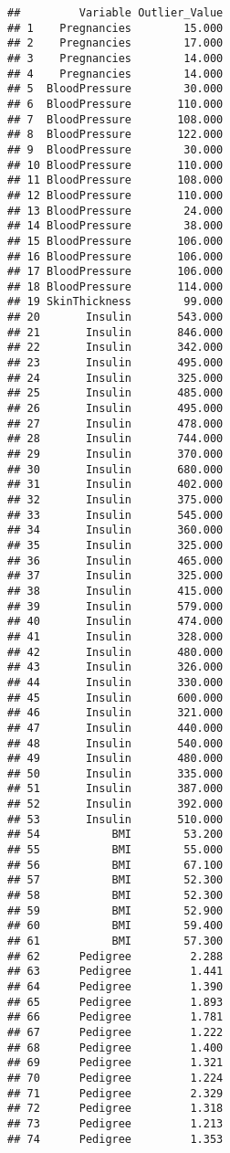 \documentclass[
]{article}
\begin{document}
\begin{verbatim}
##         Variable Outlier_Value
## 1    Pregnancies        15.000
## 2    Pregnancies        17.000
## 3    Pregnancies        14.000
## 4    Pregnancies        14.000
## 5  BloodPressure        30.000
## 6  BloodPressure       110.000
## 7  BloodPressure       108.000
## 8  BloodPressure       122.000
## 9  BloodPressure        30.000
## 10 BloodPressure       110.000
## 11 BloodPressure       108.000
## 12 BloodPressure       110.000
## 13 BloodPressure        24.000
## 14 BloodPressure        38.000
## 15 BloodPressure       106.000
## 16 BloodPressure       106.000
## 17 BloodPressure       106.000
## 18 BloodPressure       114.000
## 19 SkinThickness        99.000
## 20       Insulin       543.000
## 21       Insulin       846.000
## 22       Insulin       342.000
## 23       Insulin       495.000
## 24       Insulin       325.000
## 25       Insulin       485.000
## 26       Insulin       495.000
## 27       Insulin       478.000
## 28       Insulin       744.000
## 29       Insulin       370.000
## 30       Insulin       680.000
## 31       Insulin       402.000
## 32       Insulin       375.000
## 33       Insulin       545.000
## 34       Insulin       360.000
## 35       Insulin       325.000
## 36       Insulin       465.000
## 37       Insulin       325.000
## 38       Insulin       415.000
## 39       Insulin       579.000
## 40       Insulin       474.000
## 41       Insulin       328.000
## 42       Insulin       480.000
## 43       Insulin       326.000
## 44       Insulin       330.000
## 45       Insulin       600.000
## 46       Insulin       321.000
## 47       Insulin       440.000
## 48       Insulin       540.000
## 49       Insulin       480.000
## 50       Insulin       335.000
## 51       Insulin       387.000
## 52       Insulin       392.000
## 53       Insulin       510.000
## 54           BMI        53.200
## 55           BMI        55.000
## 56           BMI        67.100
## 57           BMI        52.300
## 58           BMI        52.300
## 59           BMI        52.900
## 60           BMI        59.400
## 61           BMI        57.300
## 62      Pedigree         2.288
## 63      Pedigree         1.441
## 64      Pedigree         1.390
## 65      Pedigree         1.893
## 66      Pedigree         1.781
## 67      Pedigree         1.222
## 68      Pedigree         1.400
## 69      Pedigree         1.321
## 70      Pedigree         1.224
## 71      Pedigree         2.329
## 72      Pedigree         1.318
## 73      Pedigree         1.213
## 74      Pedigree         1.353

\end{verbatim}
\end{document}
